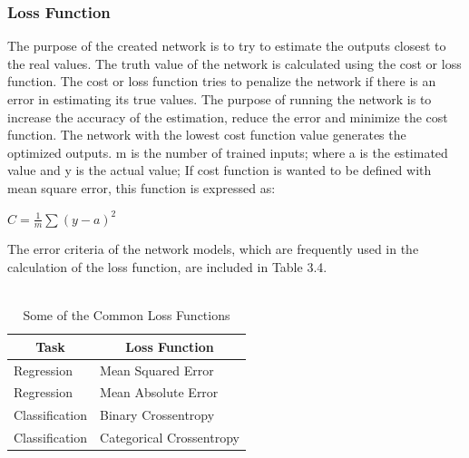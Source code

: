 \documentclass[12pt,twoside,a4]{mwbk}
\begin{document}
\subsubsection{Loss Function}
The purpose of the created network is to try to estimate the outputs closest to the real values. The truth value of the network is calculated using the cost or loss function. The cost or loss function tries to penalize the network if there is an error in estimating its true values. The purpose of running the network is to increase the accuracy of the estimation, reduce the error and minimize the cost function. The network with the lowest cost function value generates the optimized outputs. m is the number of trained inputs; where a is the estimated value and y is the actual value; If cost function is wanted to be defined with mean square error, this function is expressed as:
\begin{center}
    $C = \frac{1}{m} \sum (y - a)^{2}$
\end{center}
The error criteria of the network models, which are frequently used in the calculation of the loss function, are included in Table 3.4.
\\ \\
\begin{table}[h!]
\centering
\begin{tabular}{||c c||} 
 \hline \hline
 \textbf{Task} & \textbf{Loss Function} \\ [0.5ex] 
    \hline\hline
    \multicolumn{1}{|l|}{Regression} & \multicolumn{1}{l|}{Mean Squared Error} \\ \hline
    \multicolumn{1}{|l|}{Regression} & \multicolumn{1}{l|}{Mean Absolute Error} \\ \hline
    \multicolumn{1}{|l|}{Classification} & \multicolumn{1}{l|}{Binary Crossentropy} \\ \hline
    \multicolumn{1}{|l|}{Classification} & \multicolumn{1}{l|}{Categorical Crossentropy} \\ \hline
    \hline
\end{tabular}
\caption{Some of the Common Loss Functions}
\end{table}
\end{document}
